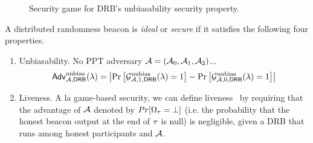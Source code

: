 \begin{figure}[h]
\label{figure:unbias}
\begin{center}
\end{center}
\caption{Security game for DRB's unbiasability security property.}
\end{figure}

\begin{definition}
A distributed randomness beacon is \textit{ideal} or \textit{secure} if it satisfies the following four properties.

\begin{enumerate}
\item Unbiasability. No PPT adversary $\mathcal{A} = (\mathcal{A}_0, \mathcal{A}_1, \mathcal{A}_2)$...
\begingroup\makeatletter\def\f@size{8}\check@mathfonts
\begin{equation*}
\mathsf{Adv}^\text{unbias}_{\mathcal{A}, \mathsf{DRB}}(\lambda) = \left|\Pr\left[\mathcal{G}^\text{unbias}_{\mathcal{A}, 1, \mathsf{DRB}}(\lambda) = 1\right] - \Pr\left[\mathcal{G}^\text{unbias}_{\mathcal{A}, 0, \mathsf{DRB}}(\lambda) = 1\right]\right|
\end{equation*}\endgroup
\item Liveness. A la game-based security, we can define liveness~\cite{guo2020secRand} by requiring that the advantage of $\mathcal{A}$ denoted by $Pr[\Omega_\tau = \text{$\perp$}]$ (i.e. the probability that the honest beacon output at the end of \epoch $\tau$ is null) is negligible, given a DRB that runs among honest participants and $\mathcal{A}$.
\end{enumerate}
\end{definition}

